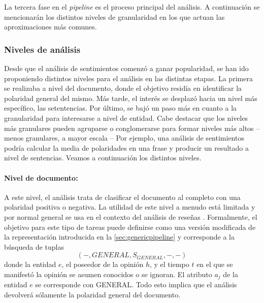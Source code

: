 La tercera fase en el \emph{pipeline} es el proceso principal del análisis. A
continuación se mencionarán los distintos niveles de granularidad en los que
actuan las aproximaciones más comunes.

\subsubsection{Niveles de análisis}
\label{sec:anallevels}

Desde que el análisis de sentimientos comenzó a ganar popularidad, se han ido
proponiendo distintos niveles para el análisis en las distintas etapas. La
primera se realizaba a nivel del documento, donde el objetivo residía en
identificar la polaridad general del mismo. Más tarde, el interés se desplazó
hacia un nivel más específico, las setentencias. Por último, se bajó un paso más
en cuanto a la granularidad para interesarse a nivel de entidad. Cabe destacar
que los niveles más granulares pueden agruparse o conglomerarse para formar
niveles más altos -- menos granulares, a mayor escala -- Por ejemplo, una
análisis de sentimientos podría calcular la media de polaridades en una frase y
producir un resultado a nivel de sentencias. Veamos a continuación los distintos
niveles.

\paragraph{Nivel de documento:}A este nivel, el análisis trata de clasificar el
documento al completo con una polaridad positiva o negativa. La utilidad de este
nivel a menudo está limitada y por normal general se usa en el contexto del
análisis de reseñas \cite{Liu2012}. Formalmente, el objetivo para este tipo de
tareas puede definirse como una versión modificada de la representación
introducida en la \autoref{sec:genericpipeline} y corresponde a la búsqueda de
tuplas
\[
  (-, GENERAL, S_{GENERAL}, -, -)
\]
donde la entidad $e$, el poseedor de la opinión $h$, y el tiempo $t$ en el que
se manifestó la opinión se asumen conocidos o se ignoran. El atributo $a_j$ de
la entidad $e$ se corresponde con GENERAL. Todo esto implica que el análisis
devolverá sólamente la polaridad general del documento.


